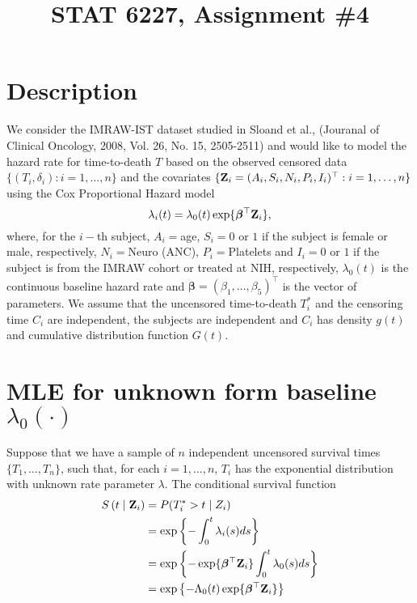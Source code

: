 \documentclass[11pt]{article}
\newcommand{\cS}[1]{S \left( #1 \mid \bZ_i \right)}
\newcommand{\bZ}{{\bf{Z}}}
\newcommand{\bbeta}{{\bm \beta}}
\begin{document}
\title{STAT 6227, Assignment \#4}
\maketitle

\section{Description}
We consider the IMRAW-IST dataset studied in Sloand et al., (Jouranal of
Clinical Oncology, 2008, Vol. 26, No. 15, 2505-2511) and would like to model the
hazard rate for time-to-death $T$ based on the observed censored data
$\{(T_i,\delta_i):i=1,\dots,n\}$ and the covariates $\{\bZ_i =
(A_i,S_i,N_i,P_i,I_i)^{\top}:i=1,\dots,n\}$ using the Cox Proportional Hazard
model
\begin{equation}
\label{eq:CoxPH}
\lambda_i(t) = \lambda_0(t)\exp\{\bbeta^{\top}\bZ_i\},
\end{equation}
where, for the $i-$th subject, $A_i=$age, $S_i=0$ or $1$ if the subject is
female or male, respectively, $N_i=$Neuro (ANC), $P_i=$Platelets and $I_i=0$ or
$1$ if the subject is from the IMRAW cohort or treated at NIH, respectively,
$\lambda_0(t)$ is the continuous baseline hazard rate and $\bbeta =
(\beta_1,\dots,\beta_5)^{\top}$ is the vector of parameters. We assume that the
uncensored time-to-death $T_i^{*}$ and the censoring time $C_i$ are independent,
the subjects are independent and $C_i$ has density $g(t)$ and cumulative
distribution function $G(t)$.

\section{MLE for unknown form baseline $\lambda_{0}(\cdot)$}

Suppose that we have a sample of $n$ independent uncensored survival times
$\{T_1,\dots,T_n\}$, such that, for each $i = 1,\dots,n$, $T_i$ has the
exponential distribution with unknown rate parameter $\lambda$.
The conditional survival function
\begin{align*}
  \cS{t} &= P(T_i^{*}>t\mid Z_i)\\
         &= \exp \left\{ -\int_0^t \lambda_i(s)ds \right\}\\
  &= \exp \left\{ -\exp\{\bbeta^{\top}\bZ_i\}\int_0^t \lambda_0(s)ds \right\}\\
  &= \exp \left\{ -\Lambda_0(t) \exp\{\bbeta^{\top}\bZ_i\} \right\}\\
\end{align*}
\end{document}
